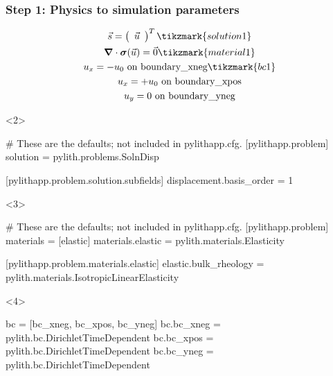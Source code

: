 \documentclass[aspectratio=169]{beamer}
\begin{document}
\begin{frame}[t,fragile]
  \frametitle{Step 1: Physics to simulation parameters}
  \summary{}

  \begin{minipage}[t]{0.35\textwidth}
    {\scriptsize
    \begin{gather*}
      \vec{s} = \left(\begin{array}{c} \vec{u} \end{array}\right)^T \tikzmark{solution1}\\
      \boldsymbol{\nabla} \cdot \boldsymbol{\sigma}(\vec{u}) = \vec{0} \tikzmark{material1}\\
      u_x = -u_0 \text{ on boundary\_xneg} \tikzmark{bc1}\\
      u_x = +u_0 \text{ on boundary\_xpos} \\
      u_y = 0 \text{ on boundary\_yneg}
    \end{gather*}}
  \end{minipage}
  \hfill
  \begin{minipage}[t]{0.60\textwidth}
    \begin{onlyenv}<2>
      \begin{cfgcode}
        # These are the defaults; not included in pylithapp.cfg.
        [pylithapp.problem]
        solution = pylith.problems.SolnDisp
        
        [pylithapp.problem.solution.subfields]
        displacement.basis_order = 1
      \end{cfgcode}
    \end{onlyenv}
    \begin{onlyenv}<3>
      \begin{cfgcode}
        # These are the defaults; not included in pylithapp.cfg.
        [pylithapp.problem]
        materials = [elastic]
        materials.elastic = pylith.materials.Elasticity

        [pylithapp.problem.materials.elastic]
        elastic.bulk_rheology = pylith.materials.IsotropicLinearElasticity
      \end{cfgcode}
    \end{onlyenv}
    \begin{onlyenv}<4>
      \begin{cfgcode}
        bc = [bc_xneg, bc_xpos, bc_yneg]
        bc.bc_xneg = pylith.bc.DirichletTimeDependent
        bc.bc_xpos = pylith.bc.DirichletTimeDependent
        bc.bc_yneg = pylith.bc.DirichletTimeDependent
        

\end{cfgcode}
\end{onlyenv}
\end{minipage}
\end{frame}
\end{document}
